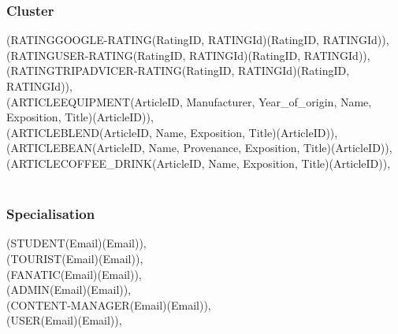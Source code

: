 {\subsubsection{Cluster}
(RATINGGOOGLE-RATING(RatingID, RATINGId)(RatingID, RATINGId)), \\
(RATINGUSER-RATING(RatingID, RATINGId)(RatingID, RATINGId)), \\
(RATINGTRIPADVICER-RATING(RatingID, RATINGId)(RatingID, RATINGId)), \\
(ARTICLEEQUIPMENT(ArticleID, Manufacturer, Year\_of\_origin, Name, Exposition, Title)(ArticleID)), \\
(ARTICLEBLEND(ArticleID, Name, Exposition, Title)(ArticleID)), \\
(ARTICLEBEAN(ArticleID, Name, Provenance, Exposition, Title)(ArticleID)), \\
(ARTICLECOFFEE\_DRINK(ArticleID, Name, Exposition, Title)(ArticleID)), \\\\
\subsubsection{Specialisation}
(STUDENT(Email)(Email)), \\
(TOURIST(Email)(Email)), \\
(FANATIC(Email)(Email)), \\
(ADMIN(Email)(Email)), \\
(CONTENT-MANAGER(Email)(Email)), \\
(USER(Email)(Email)), \\
 } 
